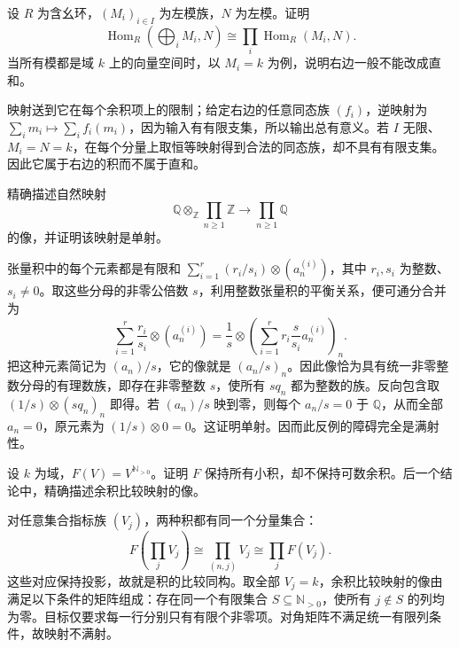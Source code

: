 \begin{exercise}\label{b4:ex:02-hom-coproduct}
	设 \(R\) 为含幺环，\((M_i)_{i\in I}\) 为左模族，\(N\) 为左模。证明
	\[
		\operatorname{Hom}_R\!\left(\bigoplus_iM_i,N\right) \cong\prod_i\operatorname{Hom}_R(M_i,N).
	\]
	当所有模都是域 \(k\) 上的向量空间时，以 \(M_i=k\) 为例，说明右边一般不能改成直和。
\end{exercise}
\begin{solution}
	映射送到它在每个余积项上的限制；给定右边的任意同态族 \((f_i)\)，逆映射为 \(\sum_i m_i\mapsto\sum_i f_i(m_i)\)，因为输入有有限支集，所以输出总有意义。若 \(I\) 无限、\(M_i=N=k\)，在每个分量上取恒等映射得到合法的同态族，却不具有有限支集。因此它属于右边的积而不属于直和。
\end{solution}

\begin{exercise}\label{b4:ex:02-rationalization-product}
	精确描述自然映射
	\[
		\mathbb Q\otimes_{\mathbb Z}\prod_{n\ge1}\mathbb Z \longrightarrow\prod_{n\ge1}\mathbb Q
	\]
	的像，并证明该映射是单射。
\end{exercise}
\begin{solution}
	张量积中的每个元素都是有限和 \(\sum_{i=1}^r(r_i/s_i)\otimes(a_n^{(i)})\)，其中 \(r_i,s_i\) 为整数、\(s_i\ne0\)。取这些分母的非零公倍数 \(s\)，利用整数张量积的平衡关系，便可通分合并为
	\[
		\sum_{i=1}^r\dfrac{r_i}{s_i}\otimes(a_n^{(i)}) =\dfrac1s\otimes\left(\sum_{i=1}^r r_i\dfrac{s}{s_i}a_n^{(i)}\right)_n.
	\]
	把这种元素简记为 \((a_n)/s\)，它的像就是 \((a_n/s)_n\)。因此像恰为具有统一非零整数分母的有理数族，即存在非零整数 \(s\)，使所有 \(sq_n\) 都为整数的族。反向包含取 \((1/s)\otimes(sq_n)_n\) 即得。若 \((a_n)/s\) 映到零，则每个 \(a_n/s=0\) 于 \(\mathbb Q\)，从而全部 \(a_n=0\)，原元素为 \((1/s)\otimes0=0\)。这证明单射。因而此反例的障碍完全是满射性。
\end{solution}

\begin{exercise}\label{b4:ex:02-exact-product-functor}
	设 \(k\) 为域，\(F(V)=V^{\mathbb N_{>0}}\)。证明 \(F\) 保持所有小积，却不保持可数余积。后一个结论中，精确描述余积比较映射的像。
\end{exercise}
\begin{solution}
	对任意集合指标族 \((V_j)\)，两种积都有同一个分量集合：
	\[
		F\!\left(\prod_jV_j\right) \cong\prod_{(n,j)}V_j \cong\prod_jF(V_j).
	\]
	这些对应保持投影，故就是积的比较同构。取全部 \(V_j=k\)，余积比较映射的像由满足以下条件的矩阵组成：存在同一个有限集合 \(S\subseteq\mathbb N_{>0}\)，使所有 \(j\notin S\) 的列均为零。目标仅要求每一行分别只有有限个非零项。对角矩阵不满足统一有限列条件，故映射不满射。
\end{solution}

